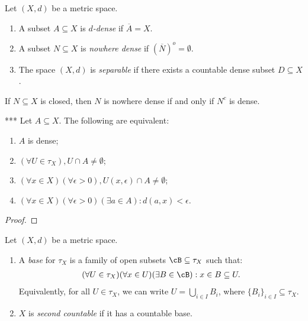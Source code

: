     \begin{definition}
        Let $(X,d)$ be a metric space.
        \begin{enumerate}[label = (\arabic*),itemsep=1pt,topsep=3pt]
            \item A subset $A \subseteq X$ is \textit{$d$-dense} if $\overline{A} = X$.
            \item A subset $N \subseteq X$ is \textit{nowhere dense} if $(\overline{N})^o = \emptyset$.
            \item The space $(X,d)$ is \textit{separable} if there exists a countable dense subset $D \subseteq X$.
        \end{enumerate}
    \end{definition}

    \begin{exercise}
        If $N \subseteq X$ is closed, then $N$ is nowhere dense if and only if $N^c$ is dense.
    \end{exercise}

    \begin{proposition}***
        Let $A \subseteq X$. The following are equivalent:
            \begin{enumerate}[label = (\arabic*),itemsep=1pt,topsep=3pt]
                \item $A$ is dense;
                \item $(\forall U \in \tau_X),U \cap A \neq \emptyset$;
                \item $(\forall x \in X)(\forall \epsilon>0), U(x,\epsilon) \cap A \neq \emptyset$;
                \item $(\forall x \in X)(\forall \epsilon>0)(\exists a \in A):d(a,x) < \epsilon$.
            \end{enumerate}
    \end{proposition}
        \begin{proof}
            
        \end{proof}

    \begin{definition}
        Let $(X,d)$ be a metric space. 
        \begin{enumerate}[label = (\arabic*),itemsep=1pt,topsep=3pt]
            \item A \textit{base} for $\tau_X$ is a family of open subsets $\cB \subseteq \tau_X$ such that:
                \begin{equation*}
                \begin{split}
                    (\forall U \in \tau_X)(\forall x\in U)(\exists B \in \cB):x \in B \subseteq U.
                \end{split}
                \end{equation*}
            Equivalently, for all $U \in \tau_X$, we can write $U = \bigcup_{i \in I}B_i$, where $\{B_i\}_{i \in I} \subseteq \tau_X$.

            \item $X$ is \textit{second countable} if it has a countable base.
        \end{enumerate}
    \end{definition}

